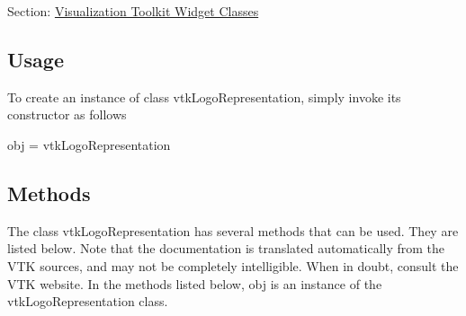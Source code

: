 Section\-: \hyperlink{sec_vtkwidgets}{Visualization Toolkit Widget Classes} \hypertarget{vtkwidgets_vtkxyplotwidget_Usage}{}\subsection{Usage}\label{vtkwidgets_vtkxyplotwidget_Usage}
To create an instance of class vtk\-Logo\-Representation, simply invoke its constructor as follows \begin{DoxyVerb}  obj = vtkLogoRepresentation
\end{DoxyVerb}
 \hypertarget{vtkwidgets_vtkxyplotwidget_Methods}{}\subsection{Methods}\label{vtkwidgets_vtkxyplotwidget_Methods}
The class vtk\-Logo\-Representation has several methods that can be used. They are listed below. Note that the documentation is translated automatically from the V\-T\-K sources, and may not be completely intelligible. When in doubt, consult the V\-T\-K website. In the methods listed below, {\ttfamily obj} is an instance of the vtk\-Logo\-Representation class. 
